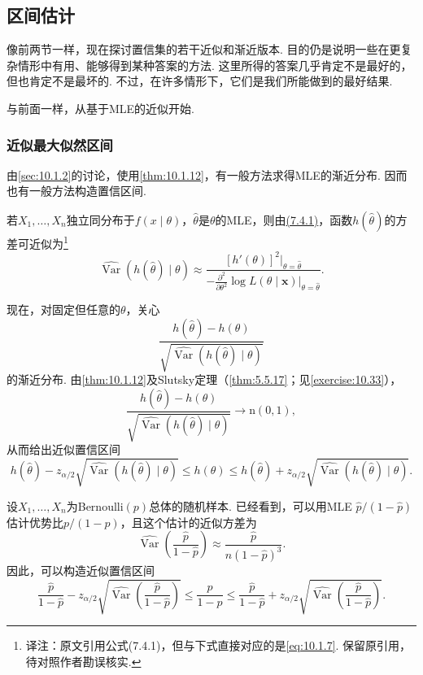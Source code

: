 \subsection{区间估计}\label{sec:10.4}
像前两节一样，现在探讨置信集的若干近似和渐近版本. 目的仍是说明一些在更复杂情形中有用、能够得到某种答案的方法. 这里所得的答案几乎肯定不是最好的，但也肯定不是最坏的. 不过，在许多情形下，它们是我们所能做到的最好结果.

与前面一样，从基于MLE的近似开始.

\subsubsection{近似最大似然区间}\label{sec:10.4.1}
由\autoref{sec:10.1.2}的讨论，使用\autoref{thm:10.1.12}，有一般方法求得MLE的渐近分布. 因而也有一般方法构造置信区间.

若$X_1,\ldots,X_n$独立同分布于$f(x\mid\theta)$，$\hat\theta$是$\theta$的MLE，则由\hyperref[eq:10.1.7]{(7.4.1)}，函数$h(\hat\theta)$的方差可近似为\footnote{译注：原文引用公式(7.4.1)，但与下式直接对应的是\eqref{eq:10.1.7}. 保留原引用，待对照作者勘误核实.}
$$\widehat{\operatorname{Var}}(h(\hat\theta)\mid\theta)\approx\frac{[h'(\theta)]^2|_{\theta=\hat\theta}}{-\frac{\partial^2}{\partial\theta^2}\log L(\theta\mid\boldsymbol x)|_{\theta=\hat\theta}}.$$

现在，对固定但任意的$\theta$，关心
$$\frac{h(\hat\theta)-h(\theta)}{\sqrt{\widehat{\operatorname{Var}}(h(\hat\theta)\mid\theta)}}$$
的渐近分布. 由\autoref{thm:10.1.12}及Slutsky定理（\autoref{thm:5.5.17}；见\autoref{exercise:10.33}），
$$\frac{h(\hat\theta)-h(\theta)}{\sqrt{\widehat{\operatorname{Var}}(h(\hat\theta)\mid\theta)}}\longrightarrow\mathrm n(0,1),$$
从而给出近似置信区间
$$h(\hat\theta)-z_{\alpha/2}\sqrt{\widehat{\operatorname{Var}}(h(\hat\theta)\mid\theta)}\leq h(\theta)\leq h(\hat\theta)+z_{\alpha/2}\sqrt{\widehat{\operatorname{Var}}(h(\hat\theta)\mid\theta)}.$$

\begin{example}[续\autoref{ex:10.1.14}]\label{ex:10.4.1}
设$X_1,\ldots,X_n$为Bernoulli$(p)$总体的随机样本. 已经看到，可以用MLE $\hat p/(1-\hat p)$估计优势比$p/(1-p)$，且这个估计的近似方差为
$$\widehat{\operatorname{Var}}\left(\frac{\hat p}{1-\hat p}\right)\approx\frac{\hat p}{n(1-\hat p)^3}.$$
因此，可以构造近似置信区间
$$\frac{\hat p}{1-\hat p}-z_{\alpha/2}\sqrt{\widehat{\operatorname{Var}}\left(\frac{\hat p}{1-\hat p}\right)}
\leq\frac p{1-p}\leq\frac{\hat p}{1-\hat p}+z_{\alpha/2}\sqrt{\widehat{\operatorname{Var}}\left(\frac{\hat p}{1-\hat p}\right)}.$$
\end{example}

